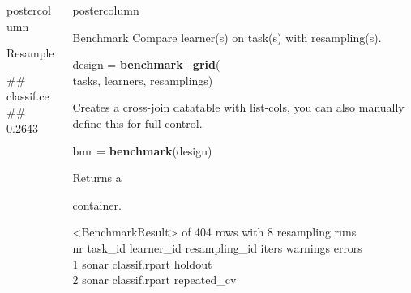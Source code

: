 \documentclass{beamer}
\newlength{\columnheight} %
\newcommand{\codeinline}[1]{\begin{codeboxinline}#1\end{codeboxinline}}
\newcommand{\monospace}[1]{\multido{}{#1}{\space}}
\begin{document}
\begin{withoutheader}
\begin{frame}[fragile]{}
\begin{columns}
\begin{column}{.245\textwidth}
\begin{beamercolorbox}[center]{postercolumn}
\begin{minipage}{.98\textwidth}
{\begin{myblock}{Resample}
\begin{codeboxexample}
{									\#\# classif.ce\\
									\#\# \monospace{4}0.2643\\
								}
							\end{codeboxexample}
							\end{myblock}
					\vfill}
				\end{minipage}
			\end{beamercolorbox}
		\end{column}
		\begin{column}{.245\textwidth}
			\begin{beamercolorbox}[center]{postercolumn}
				\begin{minipage}{.98\textwidth}
					\parbox[t][\columnheight]{\textwidth}{
						\begin{myblock}{Benchmark}
                            Compare learner(s) on task(s) with resampling(s).
						\\
						\begin{codeboxmultiline}[width=19.4cm]
							design = \textbf{benchmark\_grid}(\\
							\hspace*{1ex}tasks, learners, resamplings)
						\end{codeboxmultiline}
						Creates a cross-join datatable with list-cols, you can also manually define this for full control.
						\\
						\begin{codebox}
							bmr = \textbf{benchmark}(design)
						\end{codebox}
						Returns a \codeinline{}
						container.\\
						\begin{codeboxmultiline}[width=27cm]
							\scriptsize{
								<BenchmarkResult> of 404 rows with 8 resampling runs\\
								nr task\_id \space\space\space\space learner\_id resampling\_id iters warnings errors\\
								1 \space\space\space sonar \space classif.rpart
								\space\space\space\space\space\space holdout
								\space\space\space\space 1
								\space\space\space\space\space\space\space 0
								\space\space\space\space\space 0\\
								2 \space\space\space sonar \space classif.rpart
								\space\space repeated\_cv
								\space{}00
								\space\space\space\space\space\space{}
}
\end{codeboxmultiline}
\end{myblock}}
\end{minipage}
\end{beamercolorbox}
\end{column}
\end{columns}
\end{frame}
\end{withoutheader}
\end{document}
